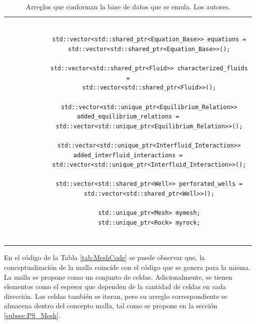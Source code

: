 \begin{table}[h!]
	\begin{tabular}{c}
		\begin{tiny}
			\begin{lstlisting}
			
			std::vector<std::shared_ptr<Equation_Base>> equations =
			std::vector<std::shared_ptr<Equation_Base>>();
			
			std::vector<std::shared_ptr<Fluid>> characterized_fluids =
			std::vector<std::shared_ptr<Fluid>>();
			
			std::vector<std::unique_ptr<Equilibrium_Relation>> added_equilibrium_relations =
			std::vector<std::unique_ptr<Equilibrium_Relation>>();
			
			std::vector<std::unique_ptr<Interfluid_Interaction>> added_interfluid_interactions =
			std::vector<std::unique_ptr<Interfluid_Interaction>>();
			
			std::vector<std::shared_ptr<Well>> perforated_wells =
			std::vector<std::shared_ptr<Well>>();
			
			std::unique_ptr<Mesh> mymesh;
			std::unique_ptr<Rock> myrock;
			
			\end{lstlisting}
		\end{tiny}
	\end{tabular}
	\caption[Arreglos que conforman la base de datos que se emula.]{Arreglos que conforman la base de datos que se emula. Los autores. \label{tab:bd}}
\end{table}

En el código de la Tabla \ref{tab:MeshCode} se puede observar que, la conceptualización de la malla coincide con el código que se genera para la misma. La malla se propone como un conjunto de celdas. Adicionalmente, se tienen elementos como el espesor que dependen de la cantidad de celdas en cada dirección. Las celdas también se iteran, pero su arreglo correspondiente se almacena dentro del concepto malla, tal como se propone en la sección \ref{subsec:PS_Mesh}.\\

